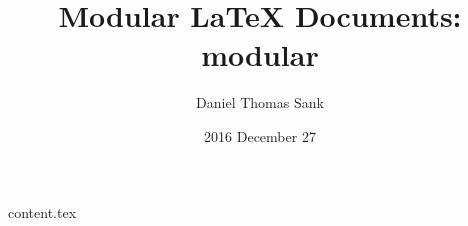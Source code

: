 \documentclass{article}
\title{Modular LaTeX Documents: \textbf{modular}}
\author{Daniel Thomas Sank}
\date{2016 December 27}
\begin{document}
\maketitle
\tableofcontents

{content.tex}
\end{document}
